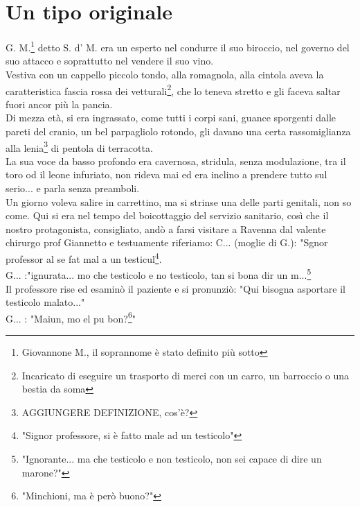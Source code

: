 
\chapter{Un tipo originale} 
G. M.\footnote{Giovannone M., il soprannome è stato definito più sotto} detto S. d' M. era un esperto nel condurre il suo biroccio, nel governo del suo attacco e soprattutto nel vendere il suo vino. \\
Vestiva con un cappello piccolo tondo, alla romagnola, alla cintola aveva la caratteristica fascia rossa dei vetturali\footnote{Incaricato di eseguire un trasporto di merci con un carro, un barroccio o una bestia da soma}, che lo teneva stretto e gli faceva saltar fuori ancor più la pancia.\\
Di mezza età, si era ingrassato, come tutti i corpi sani, guance sporgenti dalle pareti del cranio, un bel parpagliolo rotondo, gli davano una certa rassomiglianza alla lenia\footnote{AGGIUNGERE DEFINIZIONE, cos'è?} di pentola di terracotta.\\
La sua voce da basso profondo era cavernosa, stridula, senza modulazione, tra il toro od il leone infuriato, non rideva mai ed era inclino a prendere tutto sul serio... e parla senza preamboli.\\
Un giorno voleva salire in carrettino, ma si strinse una delle parti genitali, non so come. Qui si era nel tempo del boicottaggio del servizio sanitario, così che il nostro protagonista, consigliato, andò a farsi visitare a Ravenna dal valente chirurgo prof Giannetto e testuamente riferiamo:
C\:.\:.\:. (moglie di G.): "Sgnor professor al se fat mal a un testicul\footnote{"Signor professore, si è fatto male ad un testicolo"}.\\
G\:.\:.\:. :"ignurata... mo che testicolo e no testicolo, tan si bona dir un m...\footnote{"Ignorante... ma che testicolo e non testicolo, non sei capace di dire un marone?"}\\
Il professore rise ed esaminò il paziente e si pronunziò: "Qui bisogna asportare il testicolo malato..."\\
G\:.\:.\:. : "Maiun, mo el pu bon?\footnote{"Minchioni, ma è però buono?"}"
